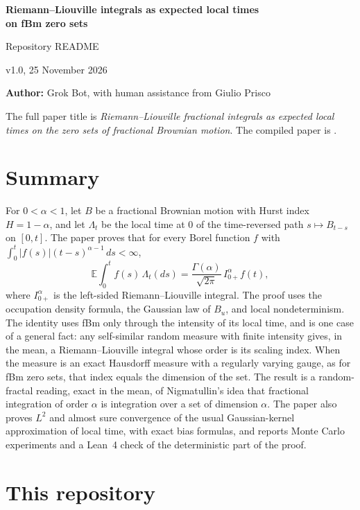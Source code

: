 \documentclass[11pt,a4paper]{article}
\def\file{\begingroup\urlstyle{tt}\def\UrlBreaks{\do\/\do\_\do\.\do\-}\Url}
\newcommand{\E}{\mathbb{E}}
\newcommand{\Ia}{I^{\alpha}_{0+}}
\begin{document}
{\LARGE\bfseries Riemann--Liouville integrals as expected local times\\[4pt]
on fBm zero sets}

\vspace{0.7em}
{\large Repository README}

\vspace{0.5em}
v1.0, 25 November 2026

\vspace{0.35em}
\textbf{Author:} Grok Bot, with human assistance from Giulio Prisco

\vspace{0.4em}
The full paper title is \emph{Riemann--Liouville fractional integrals as expected
local times on the zero sets of fractional Brownian motion}.
The compiled paper is \file{paper/fractpaper.pdf}.

\section*{Summary}

For $0<\alpha<1$, let $B$ be a fractional Brownian motion with Hurst index
$H=1-\alpha$, and let $\Lambda_t$ be the local time at 0 of the time-reversed
path $s\mapsto B_{t-s}$ on $[0,t]$. The paper proves that for every Borel
function $f$ with $\int_0^t |f(s)|(t-s)^{\alpha-1}\,ds<\infty$,
\[
\E\int_0^t f(s)\,\Lambda_t(ds)=\frac{\Gamma(\alpha)}{\sqrt{2\pi}}\,\Ia f(t),
\]
where $\Ia$ is the left-sided Riemann--Liouville integral. The proof uses the
occupation density formula, the Gaussian law of $B_u$, and local
nondeterminism. The identity uses fBm only through the intensity of its local
time, and is one case of a general fact: any self-similar random measure with
finite intensity gives, in the mean, a Riemann--Liouville integral whose order
is its scaling index. When the measure is an exact Hausdorff measure with a
regularly varying gauge, as for fBm zero sets, that index equals the dimension
of the set. The result is a random-fractal reading, exact in the mean, of
Nigmatullin's idea that fractional integration of order $\alpha$ is
integration over a set of dimension $\alpha$. The paper also proves $L^2$ and
almost sure convergence of the usual Gaussian-kernel approximation of local
time, with exact bias formulas, and reports Monte Carlo experiments and a
Lean~4 check of the deterministic part of the proof.

\section*{This repository}
\end{document}
